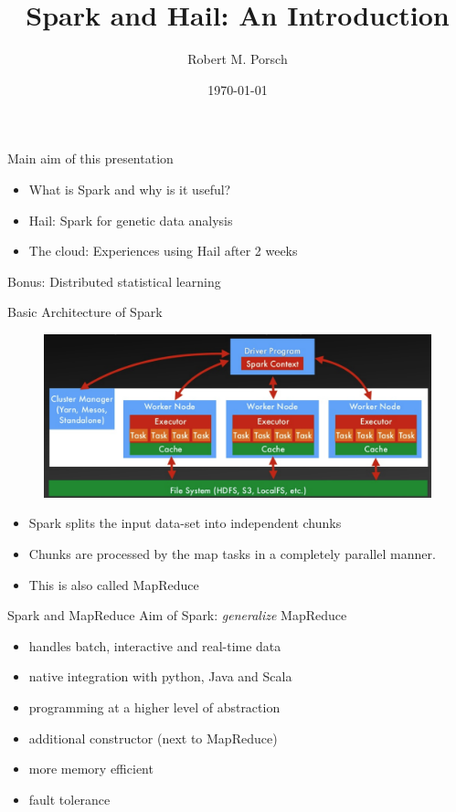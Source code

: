 \documentclass{beamer}
\title{Spark and Hail: An Introduction}
\date{\today}
\author{Robert M. Porsch}
\institute{Center of Genomic Science}
\begin{document}
\maketitle

\begin{frame}
  Main aim of this presentation
  \begin{itemize}
    \item What is Spark and why is it useful?
    \item Hail: Spark for genetic data analysis
    \item The cloud: Experiences using Hail after 2 weeks
  \end{itemize}
  Bonus: Distributed statistical learning
\end{frame}

\begin{frame}{Basic Architecture of Spark}
  \begin{figure}
    \centering
    \includegraphics[scale=0.16]{figure/reduce.png}
  \end{figure}
  \begin{itemize}
    \item Spark splits the input data-set into independent chunks
    \item Chunks are processed by the map tasks in a completely parallel manner.
    \item This is also called MapReduce
  \end{itemize}
\end{frame}
\begin{frame}{Spark and MapReduce}
  Aim of Spark: \emph{generalize} MapReduce
  \begin{itemize}
    \item handles batch, interactive and real-time data
    \item native integration with python, Java and Scala
    \item programming at a higher level of abstraction
    \item additional constructor (next to MapReduce)
    \item more memory efficient
    \item fault tolerance
  \end{itemize}
\end{frame}
\end{document}
